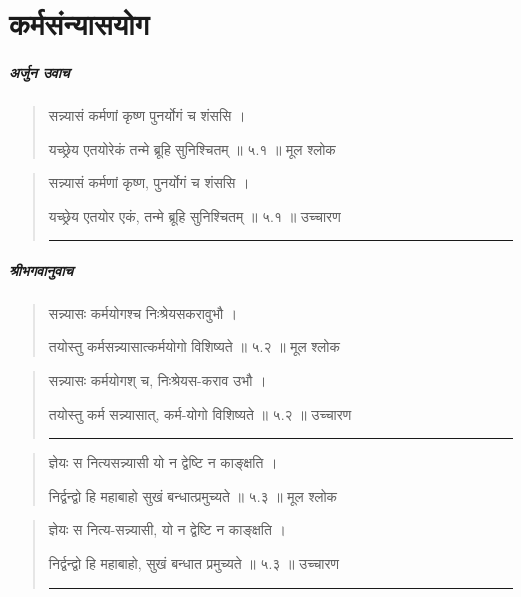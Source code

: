 \chapter{\sanskrit कर्मसंन्यासयोग}
\paragraph{\sanskrit अर्जुन उवाच}

\begin{quotation}

सन्न्यासं कर्मणां कृष्ण पुनर्योगं च शंससि  ।  

यच्छ्रेय एतयोरेकं तन्मे ब्रूहि सुनिश्चितम्‌  ॥ ५.१ ॥  मूल श्लोक
\end{quotation}

\begin{quotation}

सन्न्यासं कर्मणां कृष्ण, पुनर्योगं च शंससि  ।  

यच्छ्रेय एतयोर एकं, तन्मे ब्रूहि सुनिश्चितम्‌  ॥ ५.१ ॥  उच्चारण

\noindent\rule{16cm}{0.4pt} 
\end{quotation}

\paragraph{\sanskrit श्रीभगवानुवाच}
\begin{quotation}  


सन्न्यासः कर्मयोगश्च निःश्रेयसकरावुभौ  ।  

तयोस्तु कर्मसन्न्यासात्कर्मयोगो विशिष्यते  ॥ ५.२ ॥  मूल श्लोक
\end{quotation}

\begin{quotation}

सन्न्यासः कर्मयोगश् च, निःश्रेयस-कराव उभौ  ।  

तयोस्तु कर्म सन्न्यासात्,  कर्म-योगो विशिष्यते  ॥ ५.२ ॥  उच्चारण

\noindent\rule{16cm}{0.4pt} 
\end{quotation}


\begin{quotation}  

ज्ञेयः स नित्यसन्न्यासी यो न द्वेष्टि न काङ्‍क्षति  ।  

निर्द्वन्द्वो हि महाबाहो सुखं बन्धात्प्रमुच्यते  ॥ ५.३ ॥  मूल श्लोक
\end{quotation}

\begin{quotation}

ज्ञेयः स नित्य-सन्न्यासी, यो न द्वेष्टि न काङ्‍क्षति  ।  

निर्द्वन्द्वो हि महाबाहो, सुखं बन्धात प्रमुच्यते  ॥ ५.३ ॥  उच्चारण

\noindent\rule{16cm}{0.4pt} 
\end{quotation}


